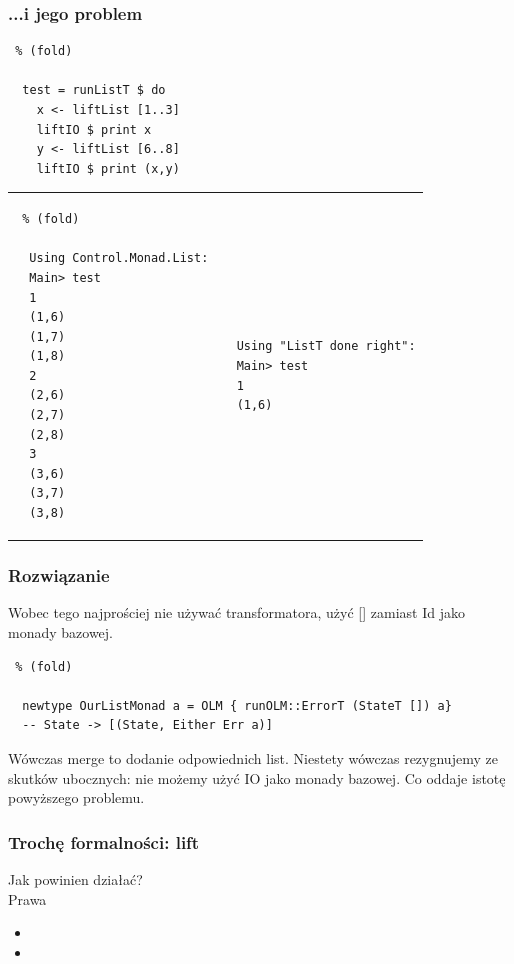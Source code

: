 \documentclass{beamer}
\begin{document}
\begin{frame}[fragile] %
  \frametitle{...i jego problem}
  \begin{lstlisting} % (fold)

  test = runListT $ do
    x <- liftList [1..3]
    liftIO $ print x
    y <- liftList [6..8]
    liftIO $ print (x,y)

  \end{lstlisting}
\end{frame}

\begin{frame}[fragile] %
  \begin{tabular}{l|l}
  
  \begin{lstlisting} % (fold)

  Using Control.Monad.List:
  Main> test
  1
  (1,6)
  (1,7)
  (1,8)
  2
  (2,6)
  (2,7)
  (2,8)
  3
  (3,6)
  (3,7)
  (3,8)

  \end{lstlisting}&
  \begin{lstlisting}

  Using "ListT done right":
  Main> test
  1
  (1,6)

  \end{lstlisting}
  \end{tabular}
\end{frame}

\begin{frame}[fragile]
  \frametitle{Rozwiązanie}
  Wobec tego najprościej nie używać transformatora, użyć [] zamiast Id jako monady bazowej.\\
  \begin{lstlisting} % (fold)

  newtype OurListMonad a = OLM { runOLM::ErrorT (StateT []) a}
  -- State -> [(State, Either Err a)]

  \end{lstlisting}
  Wówczas merge to dodanie odpowiednich list.
  Niestety wówczas rezygnujemy ze skutków ubocznych: nie możemy użyć IO jako monady bazowej. Co oddaje istotę powyższego problemu.
\end{frame}

\begin{frame}[fragile] %
  \frametitle{Trochę formalności: lift}
  Jak powinien działać?\\
  Prawa\\
  \begin{itemize}
    \item {}
    \item {} 
  \end{itemize}
\end{frame}
\end{document}
